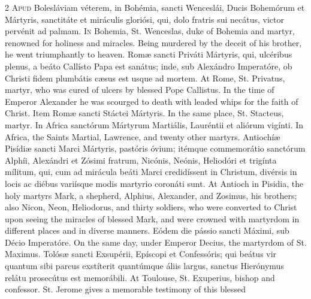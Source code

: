 \begin{paracol}{2}
\lettrine[lines=2]{A}{pud} Bolesláviam 
 véterem, in Bohémia, sancti Wenceslái, Ducis Bohemórum et Mártyris, 
 sanctitáte et miráculis gloriósi, qui, dolo fratris sui necátus, victor 
 pervénit ad palmam.
\switchcolumn
{}
\lettrine[lines=2]{I}{n} Bohemia, St. Wenceslas, duke of 
 Bohemia and martyr, renowned for holiness and miracles. Being murdered 
 by the deceit of his brother, he went triumphantly to heaven.
\switchcolumn*
{}
Romæ sancti Priváti 
 Mártyris, qui, ulcéribus plenus, a beáto Callísto Papa est sanátus; inde, 
 sub Alexándro Imperatóre, ob Christi fidem plumbátis cæsus est usque ad 
 mortem.
\switchcolumn
{}
At Rome, St. Privatus, martyr, who 
 was cured of ulcers by blessed Pope Callistus. In the time of Emperor 
 Alexander he was scourged to death with leaded whips for the faith of 
 Christ.
\switchcolumn*
{}
Item Romæ sancti 
 Stáctei Mártyris.
\switchcolumn
{}
In the same place, St. Stacteus, 
 martyr.
\switchcolumn*
{}
In Africa sanctórum 
 Mártyrum Martiális, Lauréntii et aliórum vigínti.
\switchcolumn
{}
In Africa, the Saints Martial, 
 Lawrence, and twenty other martyrs.
\switchcolumn*
{}
Antiochíæ Pisídiæ 
 sancti Marci Mártyris, pastóris óvium; itémque commemorátio sanctórum Alphíi, 
 Alexándri et Zósimi fratrum, Nicónis, Neónis, Heliodóri et trigínta mílitum, 
 qui, cum ad mirácula beáti Marci credidíssent in Christum, divérsis in locis 
 ac diébus variísque modis martyrio coronáti sunt.
\switchcolumn
{}
At Antioch in Pisidia, the holy 
 martyrs Mark, a shepherd, Alphius, Alexander, and Zosimus, his brothers; 
 also Nicon, Neon, Heliodorus, and thirty soldiers, who were converted to 
 Christ upon seeing the miracles of blessed Mark, and were crowned with 
 martyrdom in different places and in diverse manners.
\switchcolumn*
{}
Eódem die pássio sancti 
 Máximi, sub Décio Imperatóre.
\switchcolumn
{}
On the same day, under Emperor 
 Decius, the martyrdom of St. Maximus.
\switchcolumn*
{}
Tolósæ sancti Exsupérii, 
 Epíscopi et Confessóris; qui beátus vir quantum sibi parcus exstíterit 
 quantúmque áliis largus, sanctus Hierónymus relátu prosecútus est memorábili.
\switchcolumn
{}
At Toulouse, St. Exuperius, bishop 
 and confessor. St. Jerome gives a memorable testimony of this blessed 

\end{paracol}
